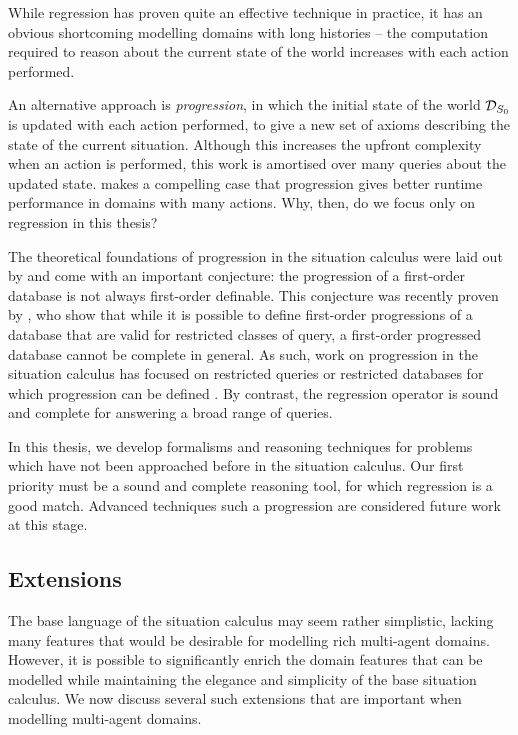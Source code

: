 While regression has proven quite an effective technique in practice,
it has an obvious shortcoming modelling domains with long histories
-- the computation required to reason about the current state of the
world increases with each action performed.

An alternative approach is \emph{progression}, in which the initial
state of the world $\mathcal{D}_{S_{0}}$ is updated with each action performed,
to give a new set of axioms describing the state of the current situation.
Although this increases the upfront complexity when an action is performed,
this work is amortised over many queries about the updated state.
\citet{thielscher04case_for_progression} makes a compelling case
that progression gives better runtime performance in domains with
many actions. Why, then, do we focus only on regression in this thesis?

The theoretical foundations of progression in the situation calculus
were laid out by \citet{reiter97progression} and come with an important
conjecture: the progression of a first-order database is not always
first-order definable. This conjecture was recently proven by \citet{vassos08progression_future_queries},
who show that while it is possible to define first-order progressions
of a database that are valid for restricted classes of query, a first-order
progressed database cannot be complete in general. As such, work on
progression in the situation calculus has focused on restricted queries
or restricted databases for which progression can be defined \citep{liu05sc_progression_knowledge,vassos07progression,vassos08fo_strong_progression}.
By contrast, the regression operator is sound and complete for answering
a broad range of queries.

In this thesis, we develop formalisms and reasoning techniques for
problems which have not been approached before in the situation calculus.
Our first priority must be a sound and complete reasoning tool, for
which regression is a good match. Advanced techniques such a progression
are considered future work at this stage.


\subsection{Extensions}

The base language of the situation calculus may seem rather simplistic,
lacking many features that would be desirable for modelling rich multi-agent
domains. However, it is possible to significantly enrich the domain
features that can be modelled while maintaining the elegance and simplicity
of the base situation calculus. We now discuss several such extensions
that are important when modelling multi-agent domains.


